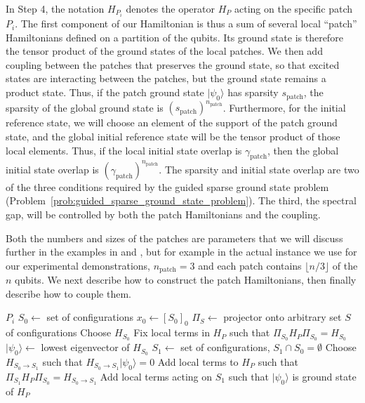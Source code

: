 \documentclass[
  reprint,            %
  amsmath,amssymb,
  aps,
  superscriptaddress, %
  longbibliography
]{revtex4-2}
\theoremstyle{definition}
\begin{document}
In Step 4, the notation $H_{P_i}$ denotes the operator $H_P$ acting on the specific patch $P_i$.
The first component of our Hamiltonian is thus a sum of several local ``patch'' Hamiltonians defined on a partition of the qubits.
Its ground state is therefore the tensor product of the ground states of the local patches.
We then add coupling between the patches that preserves the ground state, so that excited states are interacting between the patches, but the ground state remains a product state.
Thus, if the patch ground state $|\psi_0\rangle$ has sparsity $s_\mathrm{patch}$, the sparsity of the global ground state is $(s_\mathrm{patch})^{n_\mathrm{patch}}$.
Furthermore, for the initial reference state, we will choose an element of the support of the patch ground state, and the global initial reference state will be the tensor product of those local elements.
Thus, if the local initial state overlap is $\gamma_\mathrm{patch}$, then the global initial state overlap is $(\gamma_\mathrm{patch})^{n_\mathrm{patch}}$.
The sparsity and initial state overlap are two of the three conditions required by the guided sparse ground state problem (Problem~\ref{prob:guided_sparse_ground_state_problem}).
The third, the spectral gap, will be controlled by both the patch Hamiltonians and the coupling.

Both the numbers and sizes of the patches are parameters that we will discuss further in the examples in  and , but for example in the actual instance we use for our experimental demonstrations, $n_\mathrm{patch}=3$ and each patch contains $\lfloor n/3\rfloor$ of the $n$ qubits.
We next describe how to construct the patch Hamiltonians, then finally describe how to couple them.

\begin{algorithm}[H]
\caption{Patch Hamiltonian construction}\label{alg:patch_const}
\begin{algorithmic}[1]
    \Require $P_i$ 
    \State $S_0 \gets$ set of configurations 
    \State $x_0 \gets [S_0]_0$ 
    \State $\Pi_{S} \gets$ projector onto arbitrary set $S$ of configurations
    \State Choose $H_{S_0}$ 
    \State Fix local terms in $H_P$ such that $\Pi_{S_0}H_P\Pi_{S_0}=H_{S_0}$
    \State $|\psi_0\rangle \gets$ lowest eigenvector of $H_{S_0}$
    \State $S_1 \gets$ set of configurations, $S_1\cap S_0=\emptyset$ 
    \State Choose $H_{S_0\rightarrow S_1}$ such that $H_{S_0\rightarrow S_1}|\psi_0\rangle=0$ 
    \State Add local terms to $H_P$ such that $\Pi_{S_1}H_P\Pi_{S_0}=H_{S_0\rightarrow S_1}$
    \State Add local terms acting on $S_1$ such that $|\psi_0\rangle$ is ground state of $H_P$
\end{algorithmic}
\end{algorithm}
\end{document}

